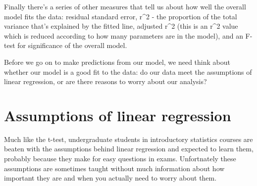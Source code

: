 \documentclass[
]{book}
\begin{document}
Finally there's a series of other measures that tell us about how well the overall model fits the data: residual standard error, r\^{}2 - the proportion of the total variance that's explained by the fitted line, adjusted r\^{}2 (this is an r\^{}2 value which is reduced according to how many parameters are in the model), and an F-test for significance of the overall model.

Before we go on to make predictions from our model, we need think about whether our model is a good fit to the data: do our data meet the assumptions of linear regression, or are there reasons to worry about our analysis?

\hypertarget{assumptions-of-linear-regression}{%
\section{Assumptions of linear regression}\label{assumptions-of-linear-regression}}

Much like the t-test, undergraduate students in introductory statistics courses are beaten with the assumptions behind linear regression and expected to learn them, probably because they make for easy questions in exams. Unfortnately these assumptions are sometimes taught without much information about how important they are and when you actually need to worry about them.
\end{document}
